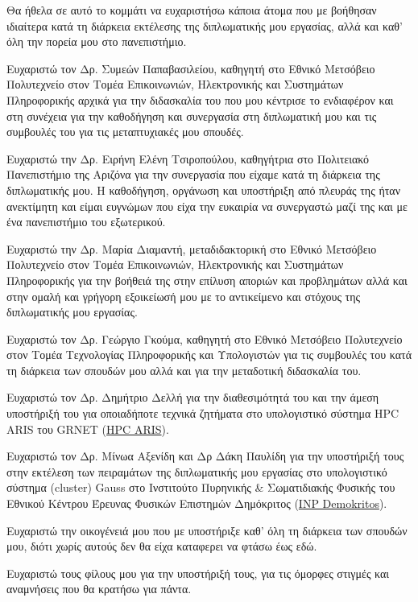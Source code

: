 \begin{acknowledgements}

Θα ήθελα σε αυτό το κομμάτι να ευχαριστήσω κάποια άτομα που με βοήθησαν ιδιαίτερα κατά τη διάρκεια εκτέλεσης της διπλωματικής μου εργασίας, αλλά και καθ' όλη την πορεία μου στο πανεπιστήμιο.

Ευχαριστώ τον Δρ. Συμεών Παπαβασιλείου, καθηγητή στο Εθνικό Μετσόβειο Πολυτεχνείο στον Τομέα Επικοινωνιών, Ηλεκτρονικής και Συστημάτων Πληροφορικής αρχικά για την διδασκαλία του που μου κέντρισε το ενδιαφέρον και στη συνέχεια για την καθοδήγηση και συνεργασία στη διπλωματική μου και τις συμβουλές του για τις μεταπτυχιακές μου σπουδές.

Ευχαριστώ την Δρ. Ειρήνη Ελένη Τσιροπούλου, καθηγήτρια στο Πολιτειακό Πανεπιστήμιο της Αριζόνα για την συνεργασία που είχαμε κατά τη διάρκεια της διπλωματικής μου. Η καθοδήγηση, οργάνωση και υποστήριξη από πλευράς της ήταν ανεκτίμητη και είμαι ευγνώμων που είχα την ευκαιρία να συνεργαστώ μαζί της και με ένα πανεπιστήμιο του εξωτερικού.

Ευχαριστώ την Δρ. Μαρία Διαμαντή, μεταδιδακτορική στο Εθνικό Μετσόβειο Πολυτεχνείο στον Τομέα Επικοινωνιών, Ηλεκτρονικής και Συστημάτων Πληροφορικής για την βοήθειά της στην επίλυση αποριών και προβλημάτων αλλά και στην ομαλή και γρήγορη εξοικείωσή μου με το αντικείμενο και στόχους της διπλωματικής μου εργασίας.

Ευχαριστώ τον Δρ. Γεώργιο Γκούμα, καθηγητή στο Εθνικό Μετσόβειο Πολυτεχνείο στον Τομέα Τεχνολογίας Πληροφορικής και Υπολογιστών για τις συμβουλές του κατά τη διάρκεια των σπουδών μου αλλά και για την μεταδοτική διδασκαλία του.

Ευχαριστώ τον Δρ. Δημήτριο Δελλή για την διαθεσιμότητά του και την άμεση υποστήριξή του για οποιαδήποτε τεχνικά ζητήματα στο υπολογιστικό σύστημα HPC ARIS του GRNET (\href{https://www.hpc.grnet.gr/}{HPC ARIS}).

Ευχαριστώ τον Δρ. Μίνωα Αξενίδη και Δρ Δάκη Παυλίδη για την υποστήριξή τους στην εκτέλεση των πειραμάτων της διπλωματικής μου εργασίας στο υπολογιστικό σύστημα (cluster) Gauss στο Ινστιτούτο Πυρηνικής \& Σωματιδιακής Φυσικής του Εθνικού Κέντρου Έρευνας Φυσικών Επιστημών Δημόκριτος (\href{https://www.demokritos.gr/el/institute/%CE%B9%CE%BD%CF%83%CF%84%CE%B9%CF%84%CE%BF%CF%8D%CF%84%CE%BF-%CF%80%CF%85%CF%81%CE%B7%CE%BD%CE%B9%CE%BA%CE%AE%CF%82-%CF%83%CF%89%CE%BC%CE%B1%CF%84%CE%B9%CE%B4%CE%B9%CE%B1%CE%BA%CE%AE%CF%82-%CF%86/}{INP Demokritos}).

Ευχαριστώ την οικογένειά μου που με υποστήριξε καθ' όλη τη διάρκεια των σπουδών μου, διότι χωρίς αυτούς δεν θα είχα καταφερει να φτάσω έως εδώ.

Ευχαριστώ τους φίλους μου για την υποστήριξή τους, για τις όμορφες στιγμές και αναμνήσεις που θα κρατήσω για πάντα.


\bigskip

\bigskip

\bigskip

\end{acknowledgements}